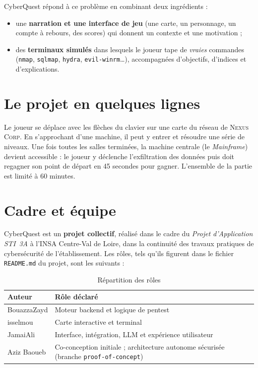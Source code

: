 \documentclass[11pt,a4paper]{report}
\newcommand{\code}[1]{\texttt{\nolinkurl{#1}}}
\newcommand{\file}[1]{\texttt{\nolinkurl{#1}}}
\begin{document}
CyberQuest r\'epond \`a ce probl\`eme en combinant deux ingr\'edients :
\begin{itemize}
  \item une \textbf{narration et une interface de jeu} (une carte, un personnage,
        un compte \`a rebours, des scores) qui donnent un contexte et une motivation ;
  \item des \textbf{terminaux simul\'es} dans lesquels le joueur tape de \emph{vraies}
        commandes (\code{nmap}, \code{sqlmap}, \code{hydra}, \code{evil-winrm}\ldots),
        accompagn\'ees d'objectifs, d'indices et d'explications.
\end{itemize}

\section{Le projet en quelques lignes}

Le joueur se d\'eplace avec les fl\`eches du clavier sur une carte du r\'eseau de
\textsc{Nexus Corp}. En s'approchant d'une machine, il peut y entrer et r\'esoudre
une s\'erie de niveaux. Une fois toutes les salles termin\'ees, la machine centrale
(le \emph{Mainframe}) devient accessible : le joueur y d\'eclenche l'exfiltration des
donn\'ees puis doit regagner son point de d\'epart en 45 secondes pour gagner.
L'ensemble de la partie est limit\'e \`a 60 minutes.

\section{Cadre et \'equipe}

CyberQuest est un \textbf{projet collectif}, r\'ealis\'e dans le cadre du \emph{Projet
d'Application STI~3A} \`a l'INSA Centre-Val de Loire, dans la continuit\'e des travaux
pratiques de cybers\'ecurit\'e de l'\'etablissement. Les r\^oles, tels qu'ils figurent dans
le fichier \file{README.md} du projet, sont les suivants :

\begin{table}[H]
\centering
\begin{tabularx}{\textwidth}{@{}lX@{}}
\toprule
\textbf{Auteur} & \textbf{R\^ole d\'eclar\'e} \\
\midrule
BouazzaZayd & Moteur backend et logique de pentest \\
isselmou    & Carte interactive et terminal \\
JamaiAli    & Interface, int\'egration, LLM et exp\'erience utilisateur \\
Aziz Baoueb & Co-conception initiale ; architecture autonome s\'ecuris\'ee
              (branche \code{proof-of-concept}) \\
\bottomrule
\end{tabularx}
\caption{R\'epartition des r\^oles}
\end{table}
\end{document}
